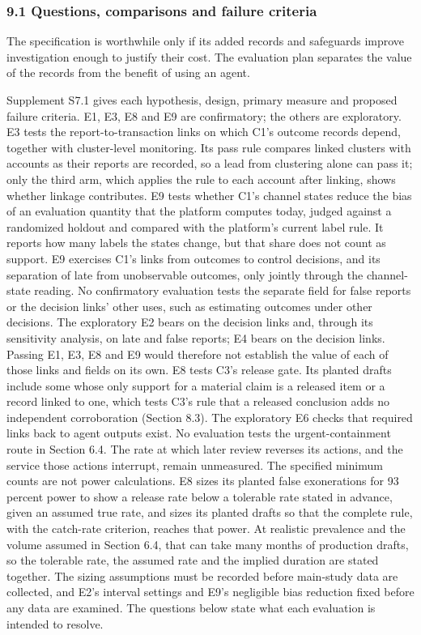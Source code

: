 \documentclass[
  11pt,
]{article}
\begin{document}
\suppressfloats[t]

\hypertarget{questions-comparisons-and-failure-criteria}{%
\subsubsection{9.1 Questions, comparisons and failure
criteria}\label{questions-comparisons-and-failure-criteria}}

The specification is worthwhile only if its added records and safeguards
improve investigation enough to justify their cost. The evaluation plan
separates the value of the records from the benefit of using an agent.

Supplement S7.1 gives each hypothesis, design, primary measure and
proposed failure criteria. E1, E3, E8 and E9 are confirmatory; the
others are exploratory. E3 tests the report-to-transaction links on
which C1's outcome records depend, together with cluster-level
monitoring. Its pass rule compares linked clusters with accounts as
their reports are recorded, so a lead from clustering alone can pass it;
only the third arm, which applies the rule to each account after
linking, shows whether linkage contributes. E9 tests whether C1's
channel states reduce the bias of an evaluation quantity that the
platform computes today, judged against a randomized holdout and
compared with the platform's current label rule. It reports how many
labels the states change, but that share does not count as support. E9
exercises C1's links from outcomes to control decisions, and its
separation of late from unobservable outcomes, only jointly through the
channel-state reading. No confirmatory evaluation tests the separate
field for false reports or the decision links' other uses, such as
estimating outcomes under other decisions. The exploratory E2 bears on
the decision links and, through its sensitivity analysis, on late and
false reports; E4 bears on the decision links. Passing E1, E3, E8 and E9
would therefore not establish the value of each of those links and
fields on its own. E8 tests C3's release gate. Its planted drafts
include some whose only support for a material claim is a released item
or a record linked to one, which tests C3's rule that a released
conclusion adds no independent corroboration (Section 8.3). The
exploratory E6 checks that required links back to agent outputs exist.
No evaluation tests the urgent-containment route in Section 6.4. The
rate at which later review reverses its actions, and the service those
actions interrupt, remain unmeasured. The specified minimum counts are
not power calculations. E8 sizes its planted false exonerations for 93
percent power to show a release rate below a tolerable rate stated in
advance, given an assumed true rate, and sizes its planted drafts so
that the complete rule, with the catch-rate criterion, reaches that
power. At realistic prevalence and the volume assumed in Section 6.4,
that can take many months of production drafts, so the tolerable rate,
the assumed rate and the implied duration are stated together. The
sizing assumptions must be recorded before main-study data are
collected, and E2's interval settings and E9's negligible bias reduction
fixed before any data are examined. The questions below state what each
evaluation is intended to resolve.
\end{document}
